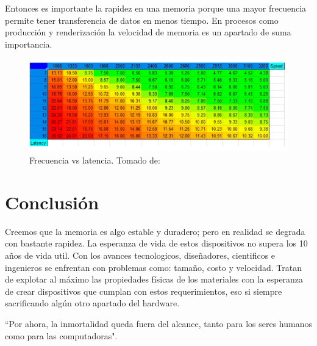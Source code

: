 \documentclass{article}
\begin{document}
Entonces es importante la rapidez en una memoria porque una mayor frecuencia permite tener transferencia de datos en menos tiempo. En procesos como producción y renderización la velocidad de memoria es un apartado de suma importancia.

\begin{figure}[h]
\includegraphics[width=12cm]{latencia.PNG}
\centering
\caption{Frecuencia vs latencia. Tomado de:\cite{Frecuencia}}
\label{latencia.PNG}
\end{figure}
\newpage
\section{Conclusión}
Creemos que la memoria es algo estable y duradero; pero en realidad se degrada con bastante rapidez. La esperanza de vida de estos dispositivos no supera los 10 años de vida util. Con los avances tecnologicos, diseñadores, cientificos e ingenieros se enfrentan con problemas como: tamaño, costo y velocidad. Tratan de explotar al máximo las propiedades físicas de los materiales con la esperanza de crear dispositivos que cumplan con estos requerimientos, eso si siempre sacrificando algún otro apartado del hardware.

 ``Por ahora, la inmortalidad queda fuera del alcance, tanto para los seres humanos como para las computadoras"\cite[How computer memory works. 4:39]{TEDwebsite}.



\newpage


\end{document}

